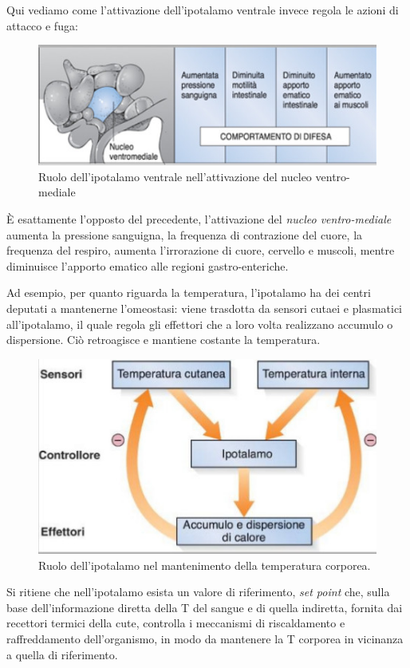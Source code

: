 \documentclass[a4paper,12pt]{article}
\begin{document}
Qui vediamo come l'attivazione dell'ipotalamo ventrale invece regola le azioni di attacco e fuga: 
\begin{figure}[H]
\centering
\includegraphics[scale=0.7]{immagine/attacco.jpg}
\caption{Ruolo dell'ipotalamo ventrale nell'attivazione del nucleo ventro-mediale}
\end{figure}
È esattamente l'opposto del precedente, l'attivazione del \emph{nucleo ventro-mediale} aumenta la pressione sanguigna, la frequenza di contrazione del cuore, la frequenza del respiro, aumenta l'irrorazione di cuore, cervello e muscoli, mentre diminuisce l'apporto ematico alle regioni gastro-enteriche.

Ad esempio, per quanto riguarda la  temperatura, l'ipotalamo ha dei centri deputati a mantenerne l'omeostasi: viene trasdotta da sensori cutaei e plasmatici all'ipotalamo, il quale regola gli effettori che a loro volta realizzano accumulo o dispersione. Ciò retroagisce e mantiene costante la temperatura.

\begin{figure}[H]
\centering
\includegraphics[scale=0.5]{immagine/cutanea.jpg}
\caption{Ruolo dell'ipotalamo nel mantenimento della temperatura corporea.}
\end{figure}

Si ritiene che nell’ipotalamo esista un valore di riferimento, \emph{set point} che, sulla base dell’informazione
diretta della T del sangue e di quella indiretta, fornita dai recettori termici della cute, controlla i meccanismi di
riscaldamento e raffreddamento dell’organismo, in modo da mantenere la T corporea in vicinanza a
quella di riferimento.
\end{document}
